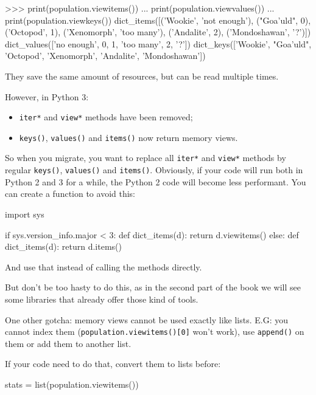 \begin{py2}
>>> print(population.viewitems())
... print(population.viewvalues())
... print(population.viewkeys())
dict_items([('Wookie', 'not enough'), ("Goa'uld", 0), ('Octopod', 1), ('Xenomorph', 'too many'), ('Andalite', 2), ('Mondoshawan', '?')])
dict_values(['no enough', 0, 1, 'too many', 2, '?'])
dict_keys(['Wookie', "Goa'uld", 'Octopod', 'Xenomorph', 'Andalite', 'Mondoshawan'])
\end{py2}

They save the same amount of resources, but can be read multiple times.

However, in Python 3:

\begin{itemize}
    \item \lstinline{iter*} and \lstinline{view*} methods have been removed;
    \item \lstinline{keys()}, \lstinline{values()} and \lstinline{items()} now return memory views.
\end{itemize}

So when you migrate, you want to replace all \lstinline{iter*} and \lstinline{view*} methods by regular \lstinline{keys()}, \lstinline{values()} and \lstinline{items()}. Obviously, if your code will run both in Python 2 and 3 for a while, the Python 2 code will become less performant. You can create a function to avoid this:

\begin{py2and3}
import sys

if sys.version_info.major < 3:
    def dict_items(d):
        return d.viewitems()
else:
    def dict_items(d):
        return d.items()
\end{py2and3}

And use that instead of calling the methods directly.

But don't be too hasty to do this, as in the second part of the book we will see some libraries that already offer those kind of tools.

One other gotcha: memory views cannot be used exactly like lists. E.G: you cannot index them (\lstinline{population.viewitems()[0]} won't work), use \lstinline{append()} on them or add them to another list.

If your code need to do that, convert them to lists before:

\begin{py3}
stats = list(population.viewitems())
\end{py3}

